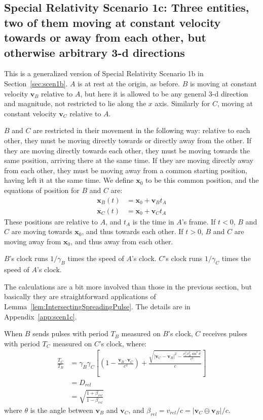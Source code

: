 \documentclass[a4paper]{article}
\theoremstyle{plain}
\theoremstyle{definition}
\newcommand{\vect}[1]{\mathbf{#1}}
\begin{document}
\subsection{Special Relativity Scenario 1c: Three entities, two of them moving at constant velocity towards or away from each other, but otherwise arbitrary 3-d directions}
\label{sec:scen1c}

This is a generalized version of Special Relativity Scenario 1b in
Section~\ref{sec:scen1b}.
$A$ is at rest at the origin, as before.
$B$ is moving at constant velocity $\vect{v}_B$ relative to $A$, but
here it is allowed to be any general 3-d direction and magnitude, not
restricted to lie along the $x$ axis.
Similarly for $C$, moving at constant velocity $\vect{v}_C$ relative
to $A$.

$B$ and $C$ are restricted in their movement in the following way:
relative to each other, they must be moving directly towards or
directly away from the other.  If they are moving directly towards
each other, they must be moving towards the same position, arriving
there at the same time.  If they are moving directly away from each
other, they must be moving away from a common starting position,
having left it at the same time.  We define $\vect{x}_0$ to be this
common position, and the equations of position for $B$ and $C$ are:
\begin{align}
\vect{x}_B(t) & = \vect{x}_0 + \vect{v}_B t_A \label{eqn:scen1c-Bpos} \\
\vect{x}_C(t) & = \vect{x}_0 + \vect{v}_C t_A \label{eqn:scen1c-Cpos}
\end{align}
These positions are relative to $A$, and $t_A$ is the time in $A$'s
frame.  If $t < 0$, $B$ and $C$ are moving towards $\vect{x}_0$, and
thus towards each other.  If $t > 0$, $B$ and $C$ are moving away from
$\vect{x}_0$, and thus away from each other.

$B$'s clock runs $1/\gamma_B$ times the speed of $A$'s clock.
$C$'s clock runs $1/\gamma_C$ times the speed of $A$'s clock.

The calculations are a bit more involved than those in the previous
section, but basically they are straightforward applications of
Lemma~\ref{lem:IntersectingSpreadingPulse}.  The details are in
Appendix~\ref{app:scen1c}.

When $B$ sends pulses with period $T_B$ measured on $B$'s clock, $C$
receives pulses with period $T_C$ measured on $C$'s clock, where:
\begin{align}
\frac{T_C}{T_B}
  & = \gamma_B \gamma_C \left[ (1 - \frac{\vect{v}_B \cdot \vect{v}_C}{c^2}) + \frac{\sqrt{ |\vect{v}_C - \vect{v}_B|^2 - \frac{v_C^2 v_B^2 \sin^2 \theta}{c^2} }}{c} \right] \nonumber \\
  & = D_{rel} \nonumber \\
  & = \sqrt{ \frac{1+\beta_{rel}}{1-\beta_{rel}} } \nonumber
\end{align}
where $\theta$ is the angle between $\vect{v}_B$ and $\vect{v}_C$,
and $\beta_{rel} = v_{rel}/c = |\vect{v}_C \ominus \vect{v}_B|/c$.
\end{document}
